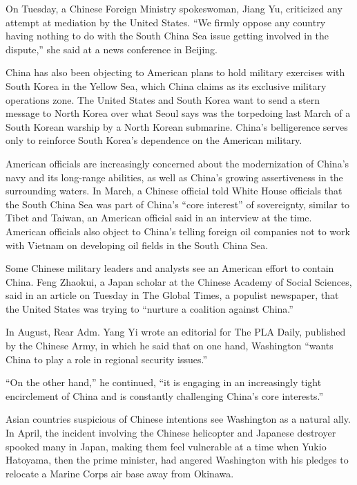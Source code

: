﻿\documentclass[12pt]{article}
\begin{document}
On Tuesday, a Chinese Foreign Ministry spokeswoman, Jiang Yu, criticized any attempt at mediation by
the United States. ``We firmly oppose any country having nothing to do with the South China Sea
issue getting involved in the dispute,'' she said at a news conference in Beijing.

China has also been objecting to American plans to hold military exercises with South Korea in the
Yellow Sea, which China claims as its exclusive military operations zone. The United States and
South Korea want to send a stern message to North Korea over what Seoul says was the torpedoing last
March of a South Korean warship by a North Korean submarine. China's belligerence serves only to
reinforce South Korea's dependence on the American military.

American officials are increasingly concerned about the modernization of China's navy and its
long-range abilities, as well as China's growing assertiveness in the surrounding waters. In March,
a Chinese official told White House officials that the South China Sea was part of China's ``core
interest'' of sovereignty, similar to Tibet and Taiwan, an American official said in an interview at
the time. American officials also object to China's telling foreign oil companies not to work with
Vietnam on developing oil fields in the South China Sea.

Some Chinese military leaders and analysts see an American effort to contain China. Feng Zhaokui, a
Japan scholar at the Chinese Academy of Social Sciences, said in an article on Tuesday in The Global
Times, a populist newspaper, that the United States was trying to ``nurture a coalition against
China.''

In August, Rear Adm. Yang Yi wrote an editorial for The PLA Daily, published by the Chinese Army, in
which he said that on one hand, Washington ``wants China to play a role in regional security
issues.''

``On the other hand,'' he continued, ``it is engaging in an increasingly tight encirclement of China
and is constantly challenging China's core interests.''

Asian countries suspicious of Chinese intentions see Washington as a natural ally. In April, the
incident involving the Chinese helicopter and Japanese destroyer spooked many in Japan, making them
feel vulnerable at a time when Yukio Hatoyama, then the prime minister, had angered Washington with
his pledges to relocate a Marine Corps air base away from Okinawa.
\end{document}
